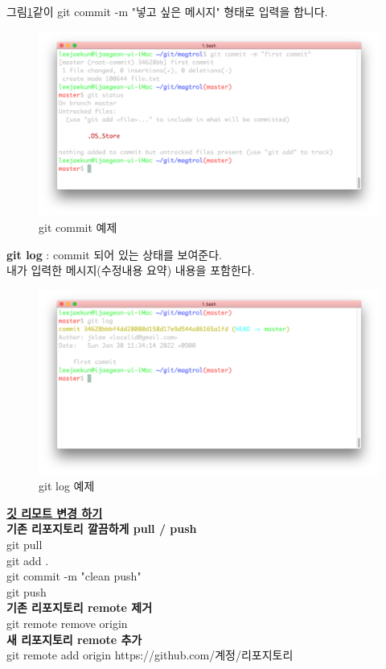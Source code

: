 그림\ref{fig:commit}\과 같이 git commit -m "넣고 싶은 메시지" 형태로 입력을 합니다. \\
%
\begin{figure} [!htbp] %
	\centering
	\captionsetup{justification=centering,margin=1cm}
	\includegraphics[width=0.7\linewidth]{./fig/commit.png}
	\caption{git commit 예제}
	\label{fig:commit}
\end{figure} 
%
 \textbf{git log} : commit 되어 있는 상태를 보여준다. \\
 내가 입력한 메시지(수정내용 요약) 내용을 포함한다. \\
\begin{figure} [!htbp] %
	\centering
	\captionsetup{justification=centering,margin=1cm}
	\includegraphics[width=0.7\linewidth]{./fig/log.png}
	\caption{git log 예제}
	\label{fig:log}
\end{figure} 
%
 
 \newpage
 \noindent \large{\href{https://gist.github.com/480/4681b67d2a906db8c6c1321cc678f05f}{\textbf{\color{blue}깃 리모트 변경 하기}} }\\
\newline \normalsize
% 
\textbf{기존 리포지토리 깔끔하게 pull / push} \\
git pull \\
git add . \\
git commit -m "clean push" \\
git push \\
%
\newline
\textbf{기존 리포지토리 remote 제거} \\
git remote remove origin \\
%
\newline
\textbf{새 리포지토리 remote 추가} \\
git remote add origin https://github.com/계정/리포지토리 \\

